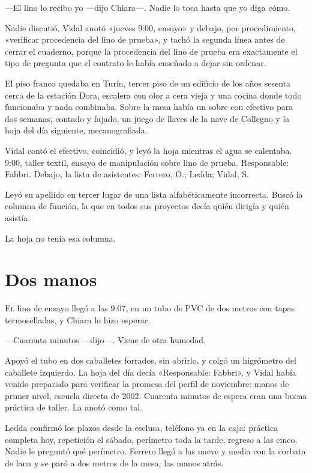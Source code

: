 ---El lino lo recibo yo ---dijo Chiara---. Nadie lo toca hasta que yo diga cómo.

Nadie discutió. Vidal anotó «jueves 9:00, ensayo» y debajo, por procedimiento, «verificar procedencia del lino de prueba», y tachó la segunda línea antes de cerrar el cuaderno, porque la procedencia del lino de prueba era exactamente el tipo de pregunta que el contrato le había enseñado a dejar sin ordenar.

El piso franco quedaba en Turín, tercer piso de un edificio de los años sesenta cerca de la estación Dora, escalera con olor a cera vieja y una cocina donde todo funcionaba y nada combinaba. Sobre la mesa había un sobre con efectivo para dos semanas, contado y fajado, un juego de llaves de la nave de Collegno y la hoja del día siguiente, mecanografiada.

Vidal contó el efectivo, coincidió, y leyó la hoja mientras el agua se calentaba. 9:00, taller textil, ensayo de manipulación sobre lino de prueba. Responsable: Fabbri. Debajo, la lista de asistentes: Ferrero, O.; Ledda; Vidal, S.

Leyó su apellido en tercer lugar de una lista alfabéticamente incorrecta. Buscó la columna de función, la que en todos sus proyectos decía quién dirigía y quién asistía.

La hoja no tenía esa columna.

\clearpage

\chapter{Dos manos}

\lettrine[lines=2, lhang=0.1, nindent=0.2em]{E}{l} lino de ensayo llegó a las 9:07, en un tubo de PVC de dos metros con tapas termoselladas, y Chiara lo hizo esperar.


---Cuarenta minutos ---dijo---. Viene de otra humedad.

Apoyó el tubo en dos caballetes forrados, sin abrirlo, y colgó un higrómetro del caballete izquierdo. La hoja del día decía «Responsable: Fabbri», y Vidal había venido preparado para verificar la promesa del perfil de noviembre: manos de primer nivel, escuela directa de 2002. Cuarenta minutos de espera eran una buena práctica de taller. La anotó como tal.

Ledda confirmó los plazos desde la esclusa, teléfono ya en la caja: práctica completa hoy, repetición el sábado, perímetro toda la tarde, regreso a las cinco. Nadie le preguntó qué perímetro. Ferrero llegó a las nueve y media con la corbata de lana y se paró a dos metros de la mesa, las manos atrás.

